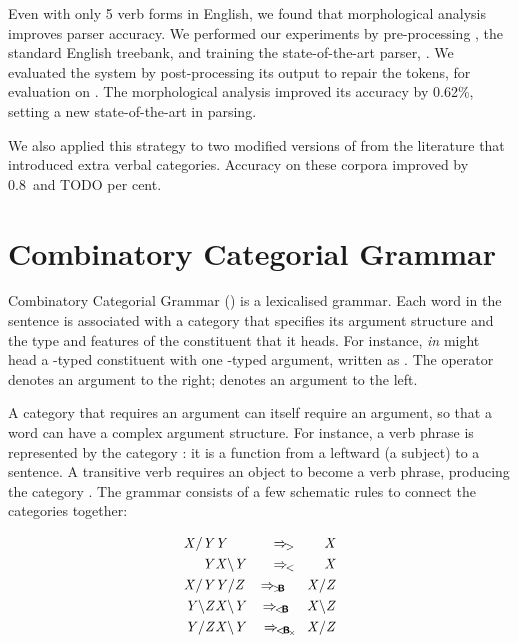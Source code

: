 \documentclass[11pt]{article}
\begin{document}
Even with only 5 verb forms in English, we found that morphological analysis
improves parser accuracy. We performed our experiments by pre-processing \ccgbank
\citep{hock:cl07}, the standard English \ccg treebank, and training the
state-of-the-art \ccg parser, \candc \citep{clark:cl07}. We evaluated the
system by post-processing its output to repair the tokens, for evaluation
on \ccgbank. The morphological analysis improved its accuracy by 0.62\%,
setting a new state-of-the-art in \ccg parsing.

We also applied this strategy
to two modified versions of \ccgbank from the literature that introduced
extra verbal categories. Accuracy on these corpora improved by 0.8\ and TODO
per cent.
\pagebreak


\section{Combinatory Categorial Grammar}

Combinatory Categorial Grammar (\ccg) \citep{steedman:00}
is a lexicalised grammar. Each word in the sentence is
associated with a category that specifies its argument structure and
the type and features of the constituent that it heads.
For instance, \emph{in} might head a  -typed constituent with
one -typed argument, written as . The \cf{/} operator
denotes an argument to the right; \cf{\bs} denotes an argument to the left.

A category that requires an argument can itself require an argument, so that a
word can have a complex argument structure. For instance, a verb phrase is
represented by the category : it is a function from a leftward
 (a subject) to a sentence. A transitive verb requires an object to
become a verb phrase, producing the category . The grammar
consists of a few schematic rules to connect the categories together:

\begin{eqnarray}
\cf{X/Y} & \cf{Y} & \Rightarrow_{\Sfapply}\;\;\;\;\;\;\; \cf{X}\nonumber\\
\cf{Y} & \cf{X\bs Y} & \Rightarrow_{\Sbapply}\;\;\;\;\;\;\; \cf{X}\nonumber\\
\cf{X/Y}    & \cf{Y/Z}    & \Rightarrow_{\Sfcomp}\;\;\;\;\; \cf{X/Z}\nonumber\\
\cf{Y\bs Z} & \cf{X\bs Y} & \Rightarrow_{\Sbcomp}\;\;\;\; \cf{X\bs Z}\nonumber\\
\cf{Y/Z} & \cf{X\bs Y} & \Rightarrow_{\Sbxcomp}\;\; \cf{X/Z}\nonumber
\end{eqnarray}
\end{document}
